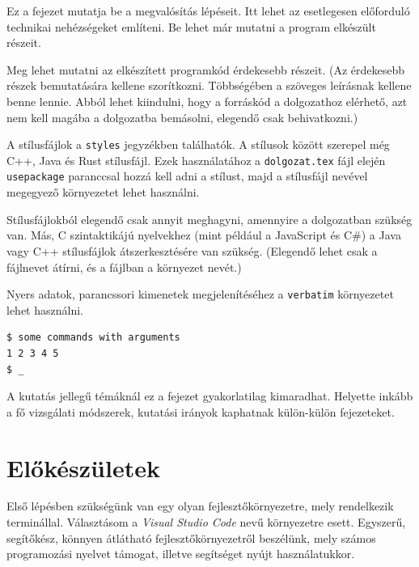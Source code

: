 
Ez a fejezet mutatja be a megvalósítás lépéseit.
Itt lehet az esetlegesen előforduló technikai nehézségeket említeni.
Be lehet már mutatni a program elkészült részeit.

Meg lehet mutatni az elkészített programkód érdekesebb részeit.
(Az érdekesebb részek bemutatására kellene szorítkozni.
Többségében a szöveges leírásnak kellene benne lennie.
Abból lehet kiindulni, hogy a forráskód a dolgozathoz elérhető, azt nem kell magába a dolgozatba bemásolni, elegendő csak behivatkozni.)

A stílusfájlok a \texttt{styles} jegyzékben találhatók.
A stílusok között szerepel még C++, Java és Rust stílusfájl.
Ezek használatához a \texttt{dolgozat.tex} fájl elején \texttt{usepackage} paranccsal hozzá kell adni a stílust, majd a stílusfájl nevével megegyező környezetet lehet használni.

Stílusfájlokból elegendő csak annyit meghagyni, amennyire a dolgozatban szükség van.
Más, C szintaktikájú nyelvekhez (mint például a JavaScript és C\#) a Java vagy C++ stílusfájlok átszerkesztésére van szükség.
(Elegendő lehet csak a fájlnevet átírni, és a fájlban a környezet nevét.)

Nyers adatok, parancssori kimenetek megjelenítéséhez a \texttt{verbatim} környezetet lehet használni.
\begin{verbatim}
$ some commands with arguments
1 2 3 4 5
$ _
\end{verbatim}

A kutatás jellegű témáknál ez a fejezet gyakorlatilag kimaradhat.
Helyette inkább a fő vizsgálati módszerek, kutatási irányok kaphatnak külön-külön fejezeteket.


\section{Előkészületek}

Első lépésben szükségünk van egy olyan fejlesztőkörnyezetre, mely rendelkezik terminállal. Választásom a \textit{Visual Studio Code} nevű környezetre esett. Egyszerű, segítőkész, könnyen átlátható fejlesztőkörnyezetről beszélünk, mely számos programozási nyelvet támogat, illetve segítséget nyújt használatukkor.

